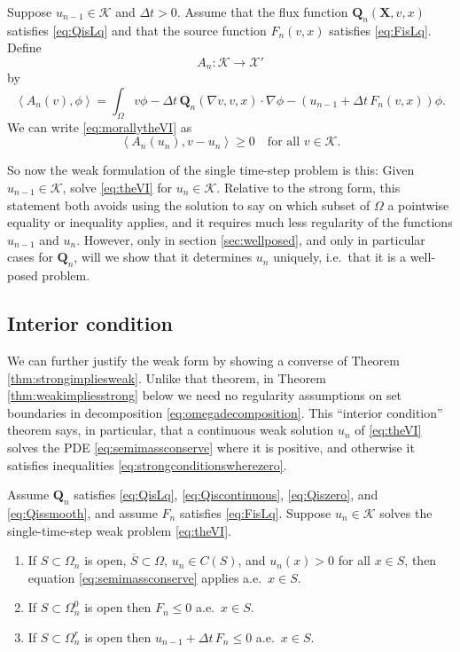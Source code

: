 \documentclass[final,leqno,onefignum,onetabnum]{siamltex1213bueler}
\newcommand\bQ{\mathbf{Q}}
\newcommand\bX{\mathbf{X}}
\renewcommand{\grad}{\nabla}
\newcommand{\ip}[2]{\ensuremath{\left<#1,#2\right>}}
\begin{document}
\medskip
\begin{definition}  Suppose $u_{n-1}\in\mathcal{K}$ and $\Delta t>0$.  Assume that the flux function $\bQ_n(\bX,v,x)$ satisfies \eqref{eq:QisLq} and that the source function $F_n(v,x)$ satisfies \eqref{eq:FisLq}.  Define
    $$A_n:\mathcal{K} \to \mathcal{X}'$$
by
\begin{equation}
  \ip{A_n(v)}{\phi} = \int_\Omega v \phi - \Delta t\, \bQ_n(\grad v,v,x) \cdot \grad\phi - \left(u_{n-1} + \Delta t\, F_n(v,x) \right) \phi. \label{eq:defineAn}
\end{equation}
We can write \eqref{eq:morallytheVI} as
\begin{equation}
  \ip{A_n(u_n)}{v-u_n} \ge 0 \quad \text{for all $v \in \mathcal{K}$.}\label{eq:theVI}
\end{equation}
\end{definition}

So now the weak formulation of the single time-step problem is this:  Given $u_{n-1}\in\mathcal{K}$, solve \eqref{eq:theVI} for $u_n\in\mathcal{K}$.  Relative to the strong form, this statement both avoids using the solution to say on which subset of $\Omega$ a pointwise equality or inequality applies, and it requires much less regularity of the functions $u_{n-1}$ and $u_n$.  However, only in section \ref{sec:wellposed}, and only in particular cases for $\bQ_n$, will we show that it determines $u_n$ uniquely, i.e.~that it is a well-posed problem.

\subsection{Interior condition}  \label{subsec:interior}  We can further justify the weak form by showing a converse of Theorem \ref{thm:strongimpliesweak}.  Unlike that theorem, in Theorem \ref{thm:weakimpliesstrong} below we need no regularity assumptions on set boundaries in decomposition \eqref{eq:omegadecomposition}.  This ``interior condition'' theorem says, in particular, that a continuous weak solution $u_n$ of \eqref{eq:theVI} solves the PDE \eqref{eq:semimassconserve} where it is positive, and otherwise it satisfies inequalities \eqref{eq:strongconditionswherezero}.

\medskip
\begin{theorem} \label{thm:weakimpliesstrong}  Assume $\bQ_n$ satisfies \eqref{eq:QisLq}, \eqref{eq:Qiscontinuous}, \eqref{eq:Qiszero}, and \eqref{eq:Qissmooth}, and assume $F_n$ satisfies \eqref{eq:FisLq}.  Suppose $u_n\in\mathcal{K}$ solves the single-time-step weak problem \eqref{eq:theVI}.
\renewcommand{\labelenumi}{\emph{(\roman{enumi})}}
\begin{enumerate}
\item If $S \subset \Omega_n$ is open, $\overline{S}\subset \Omega$, $u_n\in C(S)$, and $u_n(x)>0$ for all $x\in S$, then equation \eqref{eq:semimassconserve} applies a.e.~$x\in S$.
\item If $S \subset \Omega_n^0$ is open then $F_n \le 0$ a.e.~$x\in S$.
\item If $S \subset \Omega_n^r$ is open then $u_{n-1} + \Delta t\,F_n \le 0$ a.e.~$x\in S$.
\end{enumerate}
\end{theorem}
\end{document}
